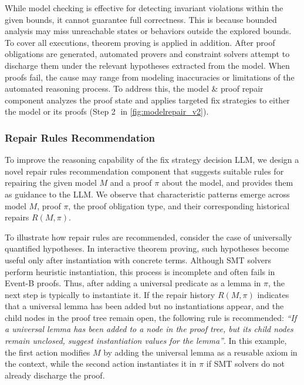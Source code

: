 While model checking is effective for detecting invariant violations within the given bounds, it cannot guarantee full correctness.
This is because bounded analysis may miss unreachable states or behaviors outside the explored bounds.
To cover all executions, theorem proving is applied in addition.
After proof obligations are generated, automated provers and constraint solvers attempt to discharge them under the relevant hypotheses extracted from the model.
When proofs fail, the cause may range from modeling inaccuracies or limitations of the automated reasoning process.
To address this, the model \& proof repair component analyzes the proof state and applies targeted fix strategies to either the model or its proofs (Step \textcircled{2} in \autoref{fig:modelrepair_v2}).



\subsubsection{Repair Rules Recommendation} \label{sec:proofrules}
To improve the reasoning capability of the fix strategy decision LLM, we design a novel repair rules recommendation component that suggests suitable rules for repairing the given model $M$ and a proof $\pi$ about the model, and provides them as guidance to the LLM.
We observe that characteristic patterns emerge across model $M$, proof $\pi$, the proof obligation type, and their corresponding historical repairs $R(M, \pi)$.

To illustrate how repair rules are recommended, consider the case of universally quantified hypotheses. 
In interactive theorem proving, such hypotheses become useful only after instantiation with concrete terms.
Although SMT solvers perform heuristic instantiation, this process is incomplete and often fails in Event-B proofs.
Thus, after adding a universal predicate as a lemma in $\pi$, the next step is typically to instantiate it. 
If the repair history $R(M, \pi)$ indicates that a universal lemma has been added but no instantiations appear, and the child nodes in the proof tree remain open, the following rule is recommended:
\textit{``If a universal lemma has been added to a node in the proof tree, but its child nodes remain unclosed, suggest instantiation values for the lemma''}.  
In this example, the first action modifies $M$ by adding the universal lemma as a reusable axiom in the context, while the second action instantiates it in $\pi$ if SMT solvers do not already discharge the proof.

